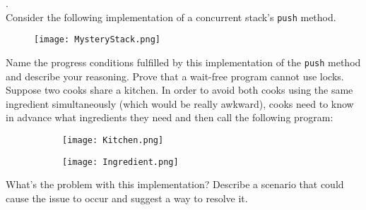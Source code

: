 \documentclass[main]{subfiles}
\begin{document}
\begin{ExerciseList}
        
        \Exercise[title={Progress Conditions},label=PC].\quad \\
            \Question Consider the following implementation of a concurrent stack's \texttt{push} method.
                \begin{figure}[H]
                    \centering
                    \texttt{[image: MysteryStack.png]}
                \end{figure}
                Name the progress conditions fulfilled by this implementation of the \texttt{push} method and describe your reasoning.
            \Question Prove that a wait-free program cannot use locks.
            \Question Suppose two cooks share a kitchen. In order to avoid both cooks using the same ingredient simultaneously (which would be really awkward), cooks need to know in advance what ingredients they need and then call the following program:
            \begin{figure}[H]
                \centering
                \begin{subfigure}{.5\textwidth}
                    \centering
                    \texttt{[image: Kitchen.png]}
                \end{subfigure}%
                \begin{subfigure}{.5\textwidth}
                    \centering
                    \texttt{[image: Ingredient.png]}
                \end{subfigure}
            \end{figure}
            What's the problem with this implementation? Describe a scenario that could cause the issue to occur and suggest a way to resolve it.
            

\end{ExerciseList}
\end{document}
